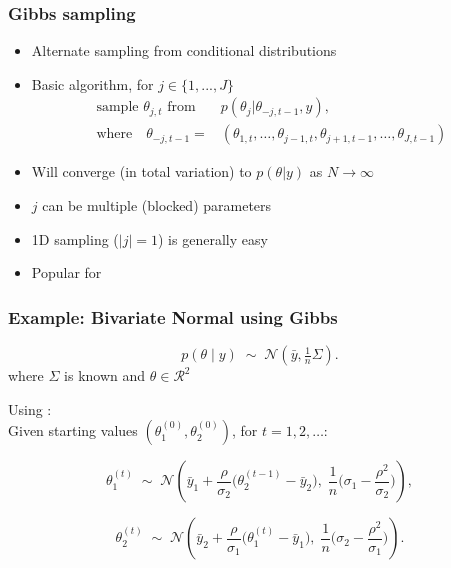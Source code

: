 \documentclass[10pt]{beamer}
\begin{document}
\begin{frame}

\frametitle{Gibbs sampling}

  \begin{itemize}
  \item Alternate sampling from conditional distributions
  \item Basic algorithm, for $j \in \{1,...,J\}$ {
      \begin{align*}
         \text{sample $\theta_{j,t}$ from} \quad & p(\theta_j|\theta_{-j,t-1}, y),\\
      \text{where} \quad
          \theta_{-j,t-1} = & (\theta_{1,t},\dots,\theta_{j-1,t},
          \theta_{j+1,t-1},\dots,\theta_{J,t-1})
      \end{align*}
      }
  \item Will converge (in total variation) to $p(\theta|y)$ as $N\rightarrow\infty$\pause
  \item $j$ can be multiple (blocked) parameters
  \item 1D sampling ($|j|=1$) is generally easy\pause
  \item Popular for 
  \end{itemize}
\end{frame}

\begin{frame}

\frametitle{Example: Bivariate Normal using Gibbs}

\[
p(\theta \mid y) \;\sim\; \mathcal{N}\!\left( \bar{y}, \tfrac{1}{n}\Sigma \right).
\]
where $\Sigma$ is known and $\theta \in \mathcal{R}^2$
\vspace{3mm}
\pause

Using :\\
\vspace{3mm}
Given starting values \((\theta_1^{(0)}, \theta_2^{(0)})\), for \(t = 1,2,\dots\):

\[
\theta_1^{(t)} \;\sim\; \mathcal{N}\!\left(
\bar{y}_1 + \frac{\rho}{\sigma_{2}}\big(\theta_2^{(t-1)} - \bar{y}_2\big),\;
\frac{1}{n}\Big(\sigma_{1} - \frac{\rho^2}{\sigma_{2}}\Big)
\right),
\]

\[
\theta_2^{(t)} \;\sim\; \mathcal{N}\!\left(
\bar{y}_2 + \frac{\rho}{\sigma_{1}}\big(\theta_1^{(t)} - \bar{y}_1\big),\;
\frac{1}{n}\Big(\sigma_{2} - \frac{\rho^2}{\sigma_{1}}\Big)
\right).
\]

\end{frame}
\end{document}
